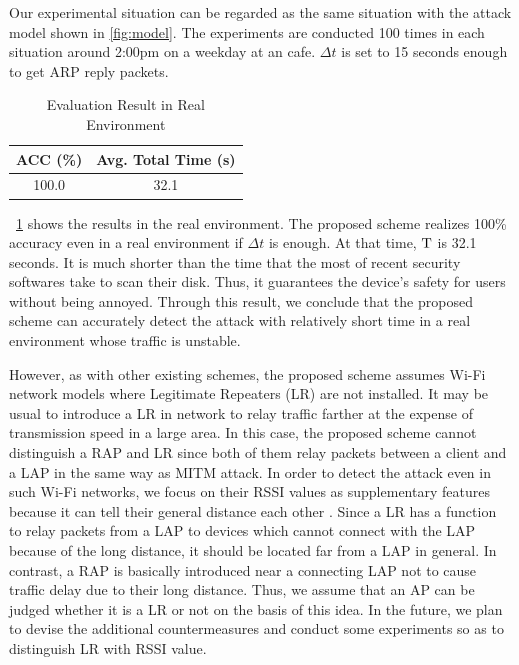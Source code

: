 \documentclass[conference]{IEEEtran}
\begin{document}
Our experimental situation can be regarded as the same situation with the attack model shown in \ref{fig:model}.
The experiments are conducted 100 times in each situation around 2:00pm on a weekday at an cafe.
$\Delta t$ is set to 15 seconds enough to get ARP reply packets.
\begin{table}[t] 
    \begin{center}
        \caption{Evaluation Result in Real Environment}
        \label{tab:real}
        \begin{tabular}{c c} \hline
            ACC (\%) & Avg. Total Time (s) \\ \hline \hline
            100.0 & 32.1 \\ \hline
        \end{tabular}
    \end{center}
    \vspace{-2zh}
\end{table}

\tablename~\ref{tab:real} shows the results in the real environment.
The proposed scheme realizes 100\% accuracy even in a real environment if $\Delta t$ is enough.
At that time, $\rm T$ is 32.1 seconds.
It is much shorter than the time that the most of recent security softwares take to scan their disk.
Thus, it guarantees the device's safety for users without being annoyed.
Through this result, we conclude that the proposed scheme can accurately detect the attack with relatively short time in a real environment whose traffic is unstable.

However, as with other existing schemes, the proposed scheme assumes Wi-Fi network models where Legitimate Repeaters (LR) are not installed.
It may be usual to introduce a LR in network to relay traffic farther at the expense of transmission speed in a large area.
In this case, the proposed scheme cannot distinguish a RAP and LR since both of them relay packets between a client and a LAP in the same way as MITM attack.
In order to detect the attack even in such Wi-Fi networks, we focus on their RSSI values as supplementary features because it can tell their general distance each other \cite{rssi}.
Since a LR has a function to relay packets from a LAP to devices which cannot connect with the LAP because of the long distance, it should be located far from a LAP in general.
In contrast, a RAP is basically introduced near a connecting LAP not to cause traffic delay due to their long distance.
Thus, we assume that an AP can be judged whether it is a LR or not on the basis of this idea.
In the future, we plan to devise the additional countermeasures and conduct some experiments so as to distinguish LR with RSSI value.
\end{document}
